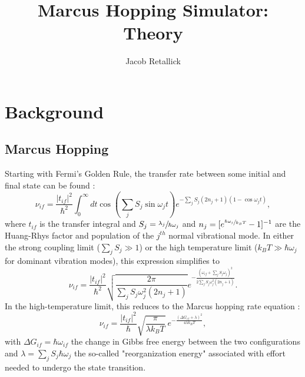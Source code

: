 \documentclass[11pt]{article}
\title{Marcus Hopping Simulator: Theory}
\author{Jacob Retallick}
\date{}
\newcommand{\kt}{k_B T}
\begin{document}
\maketitle
\vspace*{-10ex}


\section{Background}

\subsection{Marcus Hopping}

Starting with Fermi's Golden Rule, the transfer rate between some initial and final state can be found \cite{jortner76, lin02, nan09}:
\begin{equation}
\nu_{if} = \frac{|t_{if}|^2}{\hbar^2} \int_0^\infty dt \cos \left(\sum_j S_j\sin \omega_jt \right) e^{-\sum_j S_j (2n_j+1)(1-\cos \omega_jt)},
\end{equation}
where $t_{if}$ is the transfer integral and $S_j = \sfrac{\lambda_j}{\hbar\omega_j}$ and $n_j = [e^{\sfrac{\hbar\omega_j}{\kt}}-1]^{-1}$ are the Huang-Rhys factor and population of the $j^{th}$ normal vibrational mode. In either the strong coupling limit ($\sum_j S_j \gg 1$) or the high temperature limit ($\kt \gg \hbar \omega_j$ for dominant vibration modes), this expression simplifies to \cite{shuai12}
\begin{equation}
\nu_{if} = \frac{|t_{if}|^2}{\hbar^2} \sqrt{\frac{2\pi}{\sum_j S_j \omega_j^2(2n_j+1)}} e^{-\frac{(\omega_{if}+\sum_j S_j \omega_j)^2}{2\sum_j S_j\omega_j^2(2n_j+1)}}.
\end{equation}
In the high-temperature limit, this reduces to the Marcus hopping rate equation \cite{marcus93}:
\begin{equation}
\nu_{if} = \frac{|t_{if}|^2}{\hbar} \sqrt{\frac{\pi}{\lambda \kt}} \: e^{-\frac{(\Delta G_{if}+\lambda)^2}{4\lambda \kt}},
\end{equation}
with $\Delta G_{if} = \hbar \omega_{if}$ the change in Gibbs free energy between the two configurations and $\lambda = \sum_j S_j \hbar \omega_j$ the so-called "reorganization energy" associated with effort needed to undergo the state transition.
\end{document}
